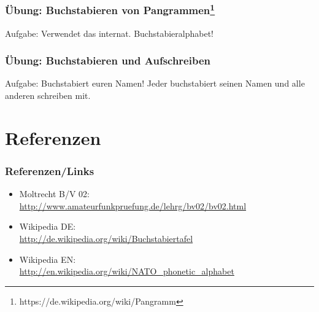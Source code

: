 \begin{frame}
    \frametitle{Übung: Buchstabieren von Pangrammen\footnote{https://de.wikipedia.org/wiki/Pangramm}}

    \begin{block}{Aufgabe: Verwendet das internat. Buchstabieralphabet!}
 
        
    
    
    
    
    \end{block}

\end{frame}

\begin{frame}
    \frametitle{Übung: Buchstabieren und Aufschreiben}

    \begin{block}{Aufgabe: Buchstabiert euren Namen!}
        Jeder buchstabiert seinen Namen und alle anderen schreiben mit.
    \end{block}

\end{frame}

\section*{Referenzen}

\begin{frame}
    \frametitle{Referenzen/Links}
    
    \footnotesize
    \begin{itemize}
        \item Moltrecht B/V 02: \\
              \url{http://www.amateurfunkpruefung.de/lehrg/bv02/bv02.html}
        \item Wikipedia DE: \\
              \url{http://de.wikipedia.org/wiki/Buchstabiertafel}
        \item Wikipedia EN: \\
              \url{http://en.wikipedia.org/wiki/NATO_phonetic_alphabet}
    \end{itemize}

\end{frame}


